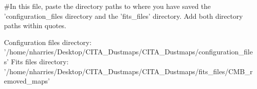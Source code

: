 #In this file, paste the directory paths to where you have saved the 'configuration_files directory and the 'fits_files' directory. Add both directory paths within quotes.

Configuration files directory: '/home/nharries/Desktop/CITA_Dustmaps/CITA_Dustmaps/configuration_files'
Fits files directory: '/home/nharries/Desktop/CITA_Dustmaps/CITA_Dustmaps/fits_files/CMB_removed_maps'
